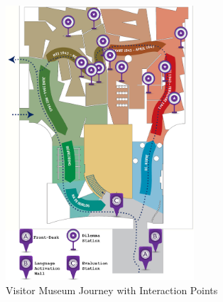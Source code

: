 \begin{figure} [H]
\includegraphics[width=7cm]{assets/Map_Points.jpg}
\caption{Visitor Museum Journey with Interaction Points}
\centering
\label{INT_MAP}
\end{figure}


 \label{systemdescription}

 \label{discussion}
\newpage

